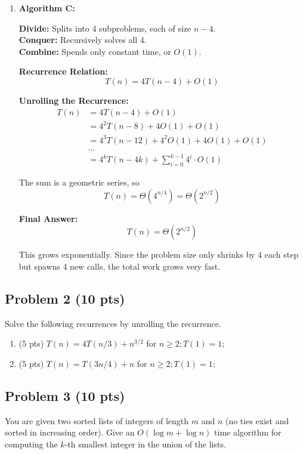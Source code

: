 \documentclass[12pt]{article}
\begin{document}
\begin{enumerate}[label=(\alph*)]
    \item \textbf{Algorithm C:}
    
    \textbf{Divide:} Splits into 4 subproblems, each of size \(n - 4\).\\
    \textbf{Conquer:} Recursively solves all 4.\\
    \textbf{Combine:} Spends only constant time, or \(O(1)\).
    
    \textbf{Recurrence Relation:}
    \[
    T(n) = 4T(n - 4) + O(1)
    \]
    
    \textbf{Unrolling the Recurrence:}
    \begin{align*}
    T(n) &= 4T(n - 4) + O(1) \\
         &= 4^2 T(n - 8) + 4O(1) + O(1) \\
         &= 4^3 T(n - 12) + 4^2O(1) + 4O(1) + O(1) \\
         &\dots \\
         &= 4^k T(n - 4k) + \sum_{i=0}^{k-1} 4^i \cdot O(1)
    \end{align*}
    
    The sum is a geometric series, so
    \[
    T(n) = \Theta(4^{n/4}) = \Theta\left(2^{n/2}\right)
    \]
    
    \textbf{Final Answer:}
    \[
    \boxed{T(n) = \Theta(2^{n/2})}
    \]
    
    This grows exponentially. Since the problem size only shrinks by 4 each step but spawns 4 new calls, the total work grows very fast.
\end{enumerate}

\subsection*{Problem 2 (10 pts)}
Solve the following recurrences by unrolling the recurrence.
\begin{enumerate}[label=(\alph*)]
    \item (5 pts) $T(n) = 4T(n/3) + n^{3/2}$ for $n\ge2; T(1)=1;$
    \item (5 pts) $T(n) = T(3n/4) + n$ for $n \ge 2; T(1)=1;$
\end{enumerate}

\subsection*{Problem 3 (10 pts)}
You are given two sorted lists of integers of length $m$ and $n$ (no ties exist and sorted in increasing order). Give an $O(\log m + \log n)$ time algorithm for computing the $k$-th smallest integer in the union of the lists.\\
\end{document}
